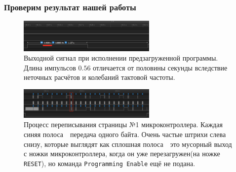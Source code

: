 \documentclass[aspectratio=169, pdf, 8pt, unicode]{beamer}
\begin{document}
\begin{frame}[fragile]
\frametitle{Проверим результат нашей работы}
	\vspace*{0.5cm}
	\begin{figure}[H]
		\centering
		\vspace*{-0.5cm}
		\includegraphics[width=0.6\textwidth]{resources/logic_preloaded.png}
		\caption{Выходной сигнал при исполнении предзагруженной программы. Длина импульсов $0.56$ отличается от
			половины секунды вследствие неточных расчётов и колебаний тактовой частоты.}
	\end{figure}
	\begin{figure}[H]
		\centering
		\vspace*{-0.5cm}
		\includegraphics[width=0.6\textwidth]{resources/logic_reprogramming.png}
		\caption{Процесс переписывания страницы №1 микроконтроллера. Каждая синяя полоса\ \cyrdash\ передача одного байта.
		         Очень частые штрихи слева снизу, которые выглядят как сплошная полоса\ \cyrdash\ это мусорный выход с
			 ножки микроконтроллера, когда он уже перезагружен(на ножке \texttt{RESET}), но команда
			 \texttt{Programming Enable} ещё не подана.}
	\end{figure}
\end{frame}
\end{document}

